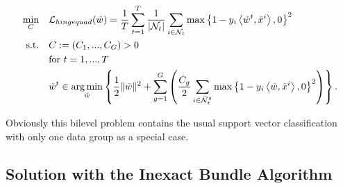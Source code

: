 \begin{align}
\begin{split}
	\min_{C} \quad &  \mathcal{L}_{hingequad}(\tilde{w}) = \frac{1}{T}\sum_{t=1}^T\frac{1}{|\mathcal{N}_t|}\sum_{i \in \mathcal{N}_t}{\max\left\{1-y_i\left\langle \tilde{w}^t,\tilde{x}^i\right\rangle,0\right\}^2}\\
	\text{s.t.} \quad & C := (C_1,...,C_G) > 0 \\
	& \text{for } t = 1,...,T \\
	& \tilde{w}^t \in \operatorname*{arg\,min}_{\tilde{w}}\left\{ \frac{1}{2} \|\tilde{w}\|^2+\sum_{g=1}^G\left(\frac{C_g}{2}\sum_{i\in \bar{\mathcal{N}}_t^g}\max\left\{1-y_i\left\langle \tilde{w},\tilde{x}^i\right\rangle,0\right\}^2\right)\right\}. \\
\end{split}
\label{bilevel_fin}
\end{align}

Obviously this bilevel problem contains the usual support vector classification with only one data group as a special case.


%
%

%





\subsection{Solution with the Inexact Bundle Algorithm}

